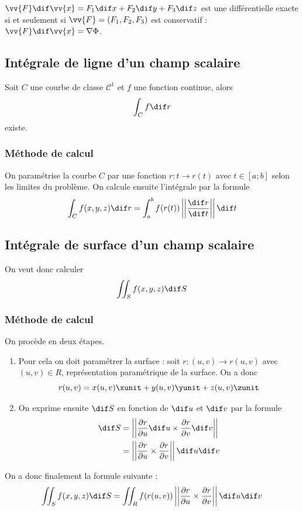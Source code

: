 \begin{mydef}
	$\vv{F}\dif \vv{x} = F_1\dif x + F_2 \dif y + F_3 \dif z$ est une différentielle exacte si et seulement
	si $\vv{F} = (F_1, F_2, F_3)$ est conservatif : $\vv{F}\dif \vv{x} = \nabla \Phi$.
\end{mydef}

\subsection{Intégrale de ligne d'un champ scalaire}

\begin{mytheo}
	Soit $C$ une courbe de classe $\mathcal{C}^1$ et $f$ une fonction continue, alors
	\[ \int_C f \dif r \]
	existe.
\end{mytheo}

\subsubsection{Méthode de calcul}

On paramétrise la courbe $C$ par une fonction $r : t \to r(t)$ avec $t \in [a;b]$ selon les limites du problème. On calcule ensuite l'intégrale par la formule
\[ \int_C f(x,y,z) \dif r = \int_a^b f(r(t)) \left|\left| \frac{\dif r}{\dif t} \right|\right| \dif t \]

\subsection{Intégrale de surface d'un champ scalaire}

On veut donc calculer
\[ \iint_S f(x,y,z) \dif S \]

\subsubsection{Méthode de calcul}

On procède en deux étapes.
\begin{enumerate}
	\item Pour cela on doit paramétrer la surface : soit $r : (u,v) \to r(u,v)$ avec $(u,v) \in R$, représentation paramétrique de la surface. On a donc
		\[ r(u,v) = x(u,v) \xunit + y(u,v) \yunit + z(u,v) \zunit \]
	\item On exprime ensuite $\dif S$ en fonction de $\dif u$ et $\dif v$ par la formule
		\begin{align*} \dif S & = \left| \left| \frac{\pa r}{\pa u} \dif u \times \frac{\pa r}{\pa v} \dif v \right| \right| \\
			& = \left| \left| \frac{\pa r}{\pa u} \times \frac{\pa r}{\pa v} \right| \right|  \dif u \dif v
		\end{align*}
\end{enumerate}
On a donc finalement la formule suivante :
\[ \iint_S f(x,y,z) \dif S = \iint_R f(r(u,v)) \left| \left| \frac{\pa r}{\pa u} \times \frac{\pa r}{\pa v} \right| \right|  \dif u \dif v \]

